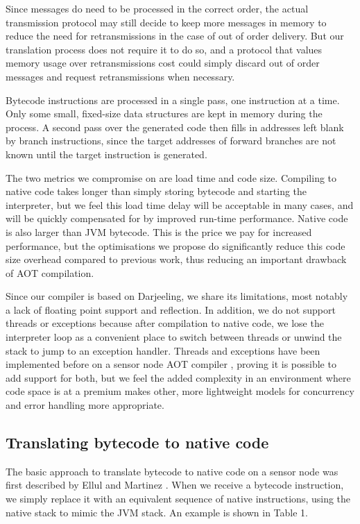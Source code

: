 Since messages do need to be processed in the correct order, the actual transmission protocol may still decide to keep more messages in memory to reduce the need for retransmissions in the case of out of order delivery. But our translation process does not require it to do so, and a protocol that values memory usage over retransmissions cost could simply discard out of order messages and request retransmissions when necessary.

Bytecode instructions are processed in a single pass, one instruction at a time. Only some small, fixed-size data structures are kept in memory during the process. A second pass over the generated code then fills in addresses left blank by branch instructions, since the target addresses of forward branches are not known until the target instruction is generated.

The two metrics we compromise on are load time and code size. Compiling to native code takes longer than simply storing bytecode and starting the interpreter, but we feel this load time delay will be acceptable in many cases, and will be quickly compensated for by improved run-time performance. Native code is also larger than JVM bytecode. This is the price we pay for increased performance, but the optimisations we propose do significantly reduce this code size overhead compared to previous work, thus reducing an important drawback of AOT compilation.

Since our compiler is based on Darjeeling, we share its limitations, most notably a lack of floating point support and reflection. In addition, we do not support threads or exceptions because after compilation to native code, we lose the interpreter loop as a convenient place to switch between threads or unwind the stack to jump to an exception handler. Threads and exceptions have been implemented before on a sensor node AOT compiler \cite{Ellul:2012thesis}, proving it is possible to add support for both, but we feel the added complexity in an environment where code space is at a premium makes other, more lightweight models for concurrency and error handling more appropriate.

\subsection{Translating bytecode to native code}
\label{sec-basic-translation}
The basic approach to translate bytecode to native code on a sensor node was first described by Ellul and Martinez \cite{Ellul:2010iw}. When we receive a bytecode instruction, we simply replace it with an equivalent sequence of native instructions, using the native stack to mimic the JVM stack. An example is shown in Table 1.


